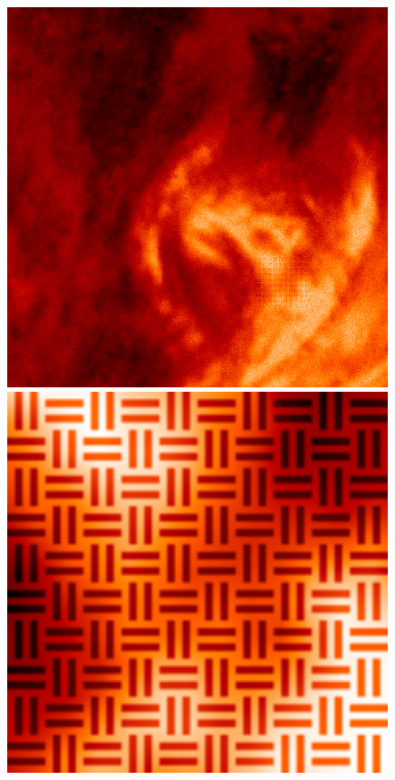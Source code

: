 \documentclass[tocnosub,noragright,centerchapter,12pt]{uiucecethesis09}
\begin{document}
\begin{figure}[h]
\begin{minipage}{.3\textwidth}
  \end{minipage}
  \begin{minipage}{.3\textwidth}
    \centering
    \includegraphics[width=1\textwidth]{figures/aia_recon.png}
  \end{minipage}
  \begin{minipage}{.3\textwidth}
    \centering
    \includegraphics[width=1\textwidth]{figures/aia_truth_zoom.png}

\end{minipage}
\end{figure}
\end{document}
